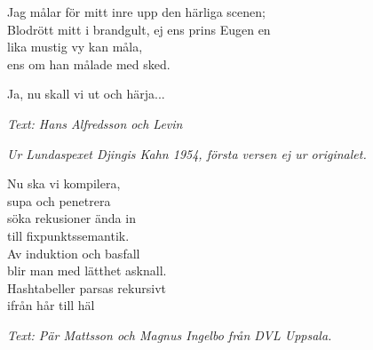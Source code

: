 Jag målar för mitt inre upp den härliga scenen;\\
Blodrött mitt i brandgult, ej ens prins Eugen en\\
lika mustig vy kan måla, \\
ens om han målade med sked.\par
\vspace{10pt}
Ja, nu skall vi ut och härja...\par
\vspace{10pt}
{\footnotesize\textit{Text: Hans Alfredsson och Levin}}\par
\vspace{10pt}
{\footnotesize\textit{Ur Lundaspexet Djingis Kahn 1954, första versen ej ur originalet.}}\par
\vspace{10pt}
Nu ska vi kompilera,\\
supa och penetrera\\
söka rekusioner ända in\\
till fixpunktssemantik.\\
Av induktion och basfall\\
blir man med lätthet asknall.\\
Hashtabeller parsas rekursivt\\
ifrån hår till häl\par
\vspace{10pt}
{\footnotesize\textit{Text: Pär Mattsson och Magnus Ingelbo från DVL
    Uppsala.}}
